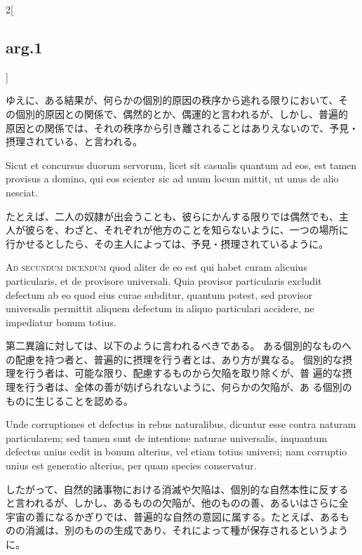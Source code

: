 \documentclass[paper=a4paper,fontsize=10pt,jafontsize=9pt,titlepage]{jlreq}
\begin{document}
\begin{paracol}{2}[\subsection{arg.1}]
\switchcolumn

ゆえに、ある結果が、何らかの個別的原因の秩序から逃れる限りにおいて、そ
の個別的原因との関係で、偶然的とか、偶運的と言われるが、しかし、普遍的
原因との関係では、それの秩序から引き離されることはありえないので、予見・
摂理されている、と言われる。

\switchcolumn*

Sicut et concursus duorum servorum, licet sit casualis quantum
ad eos, est tamen provisus a domino, qui eos scienter sic ad unum locum
mittit, ut unus de alio nesciat.

\switchcolumn

たとえば、二人の奴隷が出会うことも、彼らにかんする限りでは偶然でも、主
人が彼らを、わざと、それぞれが他方のことを知らないように、一つの場所に
行かせるとしたら、その主人によっては、予見・摂理されているように。

\switchcolumn*[\subsection{ad.2}]

{\scshape Ad secundum dicendum} quod aliter de eo est
qui habet curam alicuius particularis, et de provisore universali. Quia
provisor particularis excludit defectum ab eo quod eius curae subditur,
quantum potest, sed provisor universalis permittit aliquem defectum in
aliquo particulari accidere, ne impediatur bonum totius.

\switchcolumn

第二異論に対しては、以下のように言われるべきである。
ある個別的なものへの配慮を持つ者と、普遍的に摂理を行う者とは、あり方が異なる。
個別的な摂理を行う者は、可能な限り、配慮するものから欠陥を取り除くが、普
 遍的な摂理を行う者は、全体の善が妨げられないように、何らかの欠陥が、あ
 る個別のものに生じることを認める。

\switchcolumn*

Unde
corruptiones et defectus in rebus naturalibus, dicuntur esse contra
naturam particularem; sed tamen sunt de intentione naturae universalis,
inquantum defectus unius cedit in bonum alterius, vel etiam totius
universi; nam corruptio unius est generatio alterius, per quam species
conservatur.

\switchcolumn

したがって、自然的諸事物における消滅や欠陥は、個別的な自然本性に反する
と言われるが、しかし、あるものの欠陥が、他のものの善、あるいはさらに全
宇宙の善になるかぎりでは、普遍的な自然の意図に属する。たとえば、あるも
のの消滅は、別のものの生成であり、それによって種が保存されるというよう
に。


\end{paracol}
\end{document}
